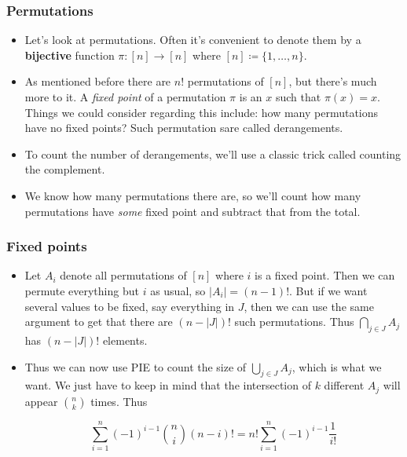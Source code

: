\documentclass{beamer}
\newcommand\abs[1]{\left|#1\right|}
\begin{document}
\begin{frame}[plain]
\frametitle{Permutations}

\begin{itemize}

\item Let's look at permutations. Often it's convenient to denote them by a \textbf{bijective} function $\pi : [n] \rightarrow [n]$ where $[n] \coloneqq \{1, \dots, n\}$.

\item As mentioned before there are $n!$ permutations of $[n]$, but there's much more to it. A \textit{fixed point} of a permutation $\pi$ is an $x$ such that $\pi(x) = x$. Things we could consider regarding this include: how many permutations have no fixed points? Such permutation sare called derangements.

\item To count the number of derangements, we'll use a classic trick called counting the complement.

\item We know how many permutations there are, so we'll count how many permutations have \textit{some} fixed point and subtract that from the total.

\end{itemize}

\end{frame}

\begin{frame}[plain]
\frametitle{Fixed points}

\begin{itemize}

\item Let $A_i$ denote all permutations of $[n]$ where $i$ is a fixed point. Then we can permute everything but $i$ as usual, so $\abs{A_i} = (n - 1)!$. But if we want several values to be fixed, say everything in $J$, then we can use the same argument to get that there are $(n - \abs{J})!$ such permutations. Thus $\bigcap_{j \in J} A_j$ has $(n - \abs{J})!$ elements.

\item Thus we can now use PIE to count the size of $\bigcup_{j \in J} A_j$, which is what we want. We just have to keep in mind that the intersection of $k$ different $A_j$ will appear $\binom{n}{k}$ times. Thus

\[\sum_{i = 1}^n (-1)^{i - 1} \binom{n}{i} (n - i)! = n!\sum_{i = 1}^n (-1)^{i - 1}\frac{1}{i!}\]

\end{itemize}

\end{frame}
\end{document}
